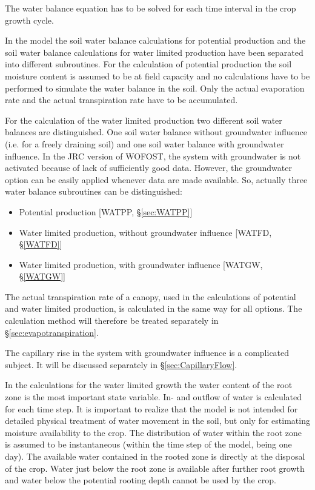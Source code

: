 The water balance equation has to be solved for each time interval in the crop growth cycle.

In the model the soil water balance calculations for potential production and the soil water
balance calculations for water limited production have been separated into different
subroutines. For the calculation of potential production the soil moisture content is
assumed to be at field capacity and no calculations have to be performed to simulate the
water balance in the soil. Only the actual evaporation rate and the actual transpiration rate
have to be accumulated. 

For the calculation of the water limited production two different soil water balances are
distinguished. One soil water balance without groundwater influence (i.e. for a freely
draining soil) and one soil water balance with groundwater influence. In the JRC version
of WOFOST, the system with groundwater is not activated because of lack of sufficiently
good data. However, the groundwater option can be easily applied whenever data are
made available. So, actually three water balance subroutines can be distinguished:
\begin{itemize}
\item Potential production [WATPP, \S \ref{sec:WATPP}]
\item Water limited production, without groundwater influence [WATFD, \S \ref{WATFD}]
\item Water limited production, with groundwater influence [WATGW, \S \ref{WATGW}]
\end{itemize}

The actual transpiration rate of a canopy, used in the calculations of potential and water
limited production, is calculated in the same way for all options. The calculation method
will therefore be treated separately in \S \ref{sec:evapotranspiration}. 

The capillary rise in the system with groundwater influence is a complicated subject. It
will be discussed separately in \S \ref{sec:CapillaryFlow}.

In the calculations for the water limited growth the water content of the root zone is the
most important state variable. In- and outflow of water is calculated for each time step. It
is important to realize that the model is not intended for detailed physical treatment of
water movement in the soil, but only for estimating moisture availability to the crop. The
distribution of water within the root zone is assumed to be instantaneous (within the time
step of the model, being one day). The available water contained in the rooted zone is
directly at the disposal of the crop. Water just below the root zone is available after
further root growth and water below the potential rooting depth cannot be used by the
crop.

